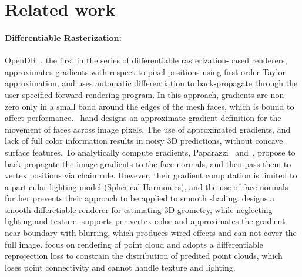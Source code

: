 \documentclass{article}
\begin{document}
\vspace{-7pt}
\section{Related work}
\vspace{-5pt}
\paragraph{Differentiable Rasterization:} 


 OpenDR~\cite{loper2014opendr}, the first in the series of differentiable rasterization-based renderers, approximates gradients with respect to pixel positions using first-order Taylor approximation, and uses automatic differentiation to back-propagate through the user-specified forward rendering program. In this approach, gradients are non-zero only in a small band around the edges of the mesh faces, which is bound to affect performance.~\cite{NMR} hand-designs an approximate gradient definition for the movement of faces across image pixels. The use of approximated gradients, and lack of full color information results in noisy 3D predictions, without concave surface features. To analytically compute gradients, Paparazzi~\cite{liu2018paparazzi} and~\cite{liuadvgeo2018}, propose to back-propagate the image gradients to the face normals, and then pass them to vertex positions via chain rule. However, their gradient computation is limited to a particular lighting model (Spherical Harmonics), and the use of face normals further prevents their approach to be applied to smooth shading. 
\cite{petersen2019pix2vex} designs a  smooth differetiable renderer for estimating 3D geometry, while neglecting lighting and texture. \cite{szabo2018unsupervised} supports per-vertex color and approximates the gradient near boundary with blurring, which produces wired effects and can not cover the full image. \cite{insafutdinov2018unsupervised} focus on rendering of point cloud and adopts a differentiable reprojection loss to constrain the distribution of predited point clouds, which loses point connectivity and cannot handle texture and lighting.
\end{document}
